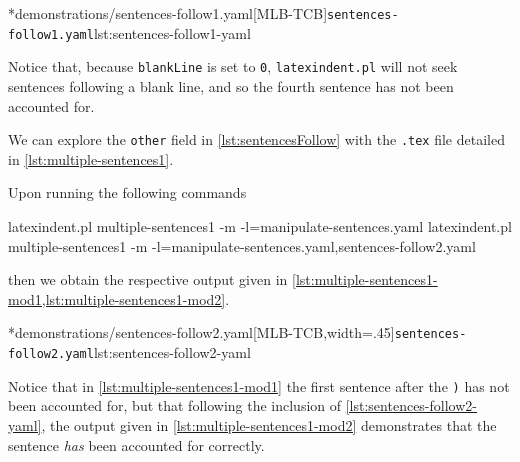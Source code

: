         \begin{cmhtcbraster}
		\cmhlistingsfromfile[style=yaml-LST]*{demonstrations/sentences-follow1.yaml}[MLB-TCB]{\texttt{sentences-follow1.yaml}}{lst:sentences-follow1-yaml}
        \end{cmhtcbraster}

	Notice that, because \texttt{blankLine} is set to \texttt{0},
	\texttt{latexindent.pl} will not seek sentences following a blank line, and so the
	fourth sentence has not been accounted for.

	We can explore the \texttt{other} field in \cref{lst:sentencesFollow} with
	the \texttt{.tex} file detailed in \cref{lst:multiple-sentences1}.


	Upon running the following commands
	\begin{widepage}
		\begin{commandshell}
latexindent.pl multiple-sentences1 -m -l=manipulate-sentences.yaml
latexindent.pl multiple-sentences1 -m -l=manipulate-sentences.yaml,sentences-follow2.yaml
	\end{commandshell}
	\end{widepage}
	then we obtain the respective output given in \cref{lst:multiple-sentences1-mod1,lst:multiple-sentences1-mod2}.

        \begin{cmhtcbraster}[
            raster force size=false,
            raster column 1/.style={add to width=1cm},
           ]
		\cmhlistingsfromfile[style=yaml-LST]*{demonstrations/sentences-follow2.yaml}[MLB-TCB,width=.45\textwidth]{\texttt{sentences-follow2.yaml}}{lst:sentences-follow2-yaml}
        \end{cmhtcbraster}

	Notice that in \cref{lst:multiple-sentences1-mod1} the first sentence after the
	\texttt{)} has not been accounted for, but that following the inclusion
	of \cref{lst:sentences-follow2-yaml}, the output given in \cref{lst:multiple-sentences1-mod2}
	demonstrates that the sentence \emph{has} been accounted for correctly.

